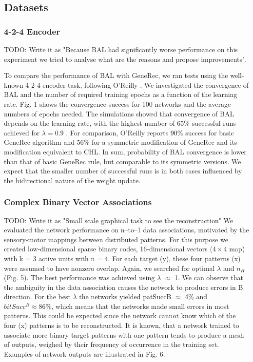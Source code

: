
\subsection{Datasets}  

\subsubsection{4-2-4 Encoder} 

TODO: Write it as "Because BAL had significantly worse performance on this experiment we tried to analyse what are the reasons and propose improvements". 

To compare the performance of BAL with GeneRec, we ran tests using the well-
known 4-2-4 encoder task, following O’Reilly \citet{o1996bio}. We investigated the convergence
of BAL and the number of required training epochs as a function of the learning
rate. Fig. 1 shows the convergence success for 100 networks and the average
numbers of epochs needed. The simulations showed that convergence of BAL
depends on the learning rate, with the highest number of 65\% successful runs
achieved for $\lambda = 0.9$ \citet{farkas2013bal}. For comparison, O’Reilly \citet{o1996bio} reports 90\% success for basic GeneRec algorithm and 56\% for a symmetric modification of GeneRec and its
modification equivalent to CHL. In sum, probability of BAL convergence is lower
than that of basic GeneRec rule, but comparable to its symmetric versions. We
expect that the smaller number of successful runs is in both cases influenced by
the bidirectional nature of the weight update.

\subsubsection{Complex Binary Vector Associations} 

TODO: Write it as "Small scale graphical task to see the reconstruction" 
We evaluated the network performance on n–to–1 data associations, motivated
by the sensory-motor mappings between distributed patterns. For this purpose
we created low-dimensional sparse binary codes, 16-dimensional vectors ($4 \times 4$
map) with k = 3 active units with n = 4. For each target (y), these four
patterns (x) were assumed to have nonzero overlap. Again, we searched for
optimal $\lambda$ and $n_H$ (Fig. 5). The best performance was achieved using $\lambda$ $\approx$ 1. We
can observe that the ambiguity in the data association causes the network to
produce errors in B direction. For the best $\lambda$ the networks yielded patSuccB $\approx$
4\% and $bitSucc^B \approx 86\%$, which means that the networks made small errors in
most patterns. This could be expected since the network cannot know which of
the four (x) patterns is to be reconstructed. It is known, that a network trained
to associate more binary target patterns with one pattern tends to produce a
mesh of outputs, weighed by their frequency of occurrence in the training set.
Examples of network outputs are illustrated in Fig. 6.

